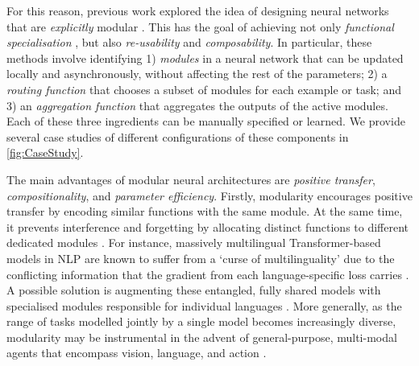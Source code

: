 \documentclass[10pt]{article} %
\begin{document}
For this reason, previous work explored the idea of designing neural networks that are \textit{explicitly} modular \citep{jacobs1991task,rosenbaum2017routing,ponti2021inductive,mittal2022is}. 
This has the goal of achieving not only \textit{functional specialisation} \citep{zhang2023emergent}, but also \textit{re-usability} and \textit{composability}.
In particular, these methods involve identifying 1) \emph{modules} in a neural network that can be updated locally and asynchronously, without affecting the rest of the parameters; 2) a \textit{routing function} that chooses a subset of modules for each example or task; and 3) an \textit{aggregation function} that aggregates the outputs of the active modules. Each of these three ingredients can be manually specified or learned. We provide several case studies of different configurations of these components in \cref{fig:CaseStudy}.

The main advantages of modular neural architectures are \textit{positive transfer}, \textit{compositionality}, and \textit{parameter efficiency}.
Firstly, modularity encourages positive transfer by encoding similar functions with the same module. At the same time, it prevents interference and forgetting by allocating distinct functions to different dedicated modules \citep{jacobs1991adaptive}. For instance, massively multilingual Transformer-based models in NLP are known to suffer from a `curse of multilinguality' \citep{conneau-etal-2020-unsupervised} due to the conflicting information that the gradient from each language-specific loss carries \citep{wang2021gradient}. A possible solution is augmenting these entangled, fully shared models with specialised modules responsible for individual languages \citep{pfeiffer-etal-2020-mad,Pfeiffer2022Lifting}. More generally, as the range of tasks modelled jointly by a single model becomes increasingly diverse, modularity may be instrumental in the advent of general-purpose, multi-modal agents that encompass vision, language, and action \citep{reed2022generalist}.
\end{document}
